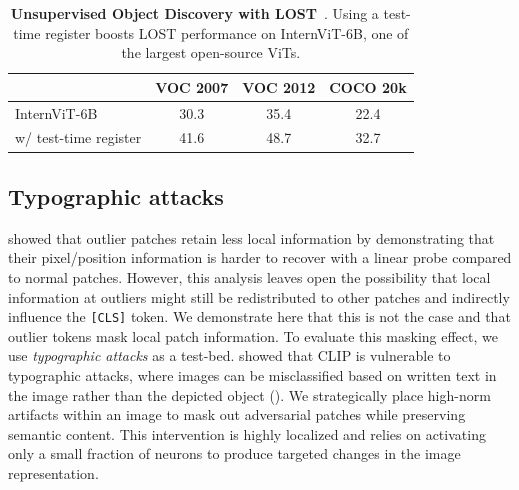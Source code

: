 \documentclass{article}
\begin{document}
\begin{table}[]
    \centering
    \begin{tabular}{l|ccc}
    \toprule
        & VOC 2007 &  VOC 2012 & COCO 20k \\
        \midrule
       
        InternViT-6B & 30.3 & 35.4 & 22.4 \\
      
        w/ test-time register & 41.6 & 48.7 & 32.7 \\
        \bottomrule
    \end{tabular}
    \vspace{0.5em}
    \caption{\textbf{Unsupervised Object Discovery with LOST}~\citep{lost}. Using a test-time register boosts LOST performance on InternViT-6B, one of the largest open-source ViTs. } 
    \label{tab:lost_internvit}
\end{table}






\subsection{Typographic attacks}
\label{typographic_attack}

\cite{darcet2024vision} showed that outlier patches retain less local information by demonstrating that their pixel/position information is harder to recover with a linear probe compared to normal patches. However, this analysis leaves open the possibility that local information at outliers might still be redistributed to other patches and indirectly influence the \texttt{[CLS]} token. We demonstrate here that this is not the case and that outlier tokens mask local patch information. To evaluate this masking effect, we use \textit{typographic attacks} as a test-bed. \cite{azuma2023defense} showed that CLIP is vulnerable to typographic attacks, where images can be misclassified based on written text in the image rather than the depicted object ().  We strategically place high-norm artifacts within an image to mask out adversarial patches while preserving semantic content. This intervention is highly localized and relies on activating only a small fraction of neurons to produce targeted changes in the image representation.
\end{document}
